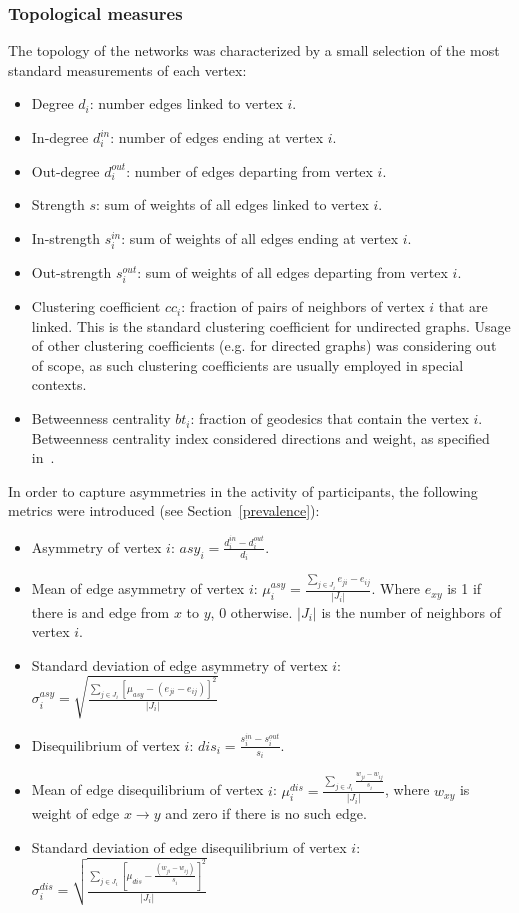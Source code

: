 \documentclass[%
 aip,
 jmp,%
 amsmath,amssymb,
 reprint,%
]{revtex4-1}
\begin{document}
        \subsubsection{Topological measures}\label{measures}
The topology of the networks was characterized by a small selection of the most standard
measurements of each vertex:

\begin{itemize}
    \item Degree $d_i$: number edges linked to                                 vertex $i$.
    \item In-degree $d_i^{in}$: number of edges ending at                      vertex $i$.
    \item Out-degree $d_i^{out}$: number of edges departing from               vertex $i$.
    \item Strength $s$: sum of weights of all edges linked to                  vertex $i$.
    \item In-strength $s_i^{in}$: sum of weights of all edges ending at        vertex $i$.
    \item Out-strength $s_i^{out}$: sum of weights of all edges departing from vertex $i$.
    \item Clustering coefficient $cc_i$: fraction of pairs of neighbors of vertex $i$ that are linked. This is the standard clustering coefficient for undirected graphs. Usage of other clustering coefficients (e.g. for directed graphs) was considering out of scope, as such clustering coefficients are usually employed in special contexts. 
    \item Betweenness centrality $bt_i$: fraction of geodesics that contain the vertex $i$. Betweenness centrality index considered directions and weight, as specified in~\cite{faster}.
\end{itemize}

In order to capture asymmetries in the activity of participants, the following metrics were introduced (see Section~\ref{prevalence}):

\begin{itemize}
    \item Asymmetry of vertex $i$: $asy_i=\frac{d_i^{in}-d_i^{out}}{d_i}$.
    \item Mean of edge asymmetry of vertex $i$: $\mu_i^{asy}=\frac{\sum_{j\in J_i} e_{ji}-e_{ij}}{|J_i|}$. Where $e_{xy}$ is 1 if there is and edge from $x$ to $y$, $0$ otherwise. $|J_i|$ is the number of neighbors of vertex $i$.
    \item Standard deviation of edge asymmetry of vertex $i$: $\sigma_i^{asy}=\sqrt{\frac{\sum_{j\in J_i}[\mu_{asy} -(e_{ji}-e_{ij}) ]^2  }{|J_i|}  }$
    \item Disequilibrium of vertex $i$: $dis_i=\frac{s_i^{in}-s_i^{out}}{s_i}$.
    \item Mean of edge disequilibrium of vertex $i$: $\mu_i^{dis}=\frac{\sum_{j \in J_i}\frac{w_{ji}-w_{ij}}{s_i}}{|J_i|}$, where $w_{xy}$ is weight of edge $x\rightarrow y$ and zero if there is no such edge.
    \item Standard deviation of edge disequilibrium of vertex $i$: $\sigma_i^{dis}=\sqrt{\frac{\sum_{j\in J_i}[\mu_{dis}-\frac{(w_{ji}-w_{ij})}{s_i}]^2}{|J_i|}}$
\end{itemize}
\end{document}

